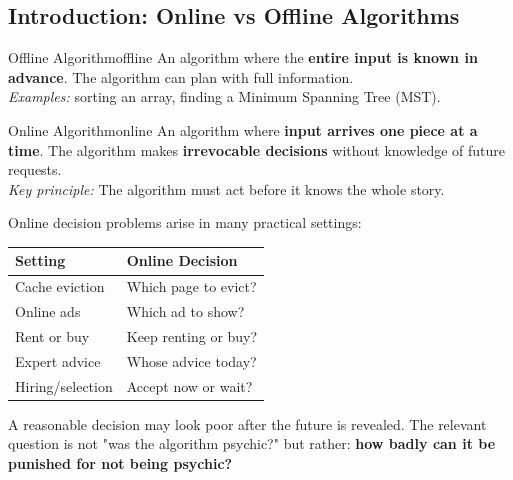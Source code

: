 %                         

\subsection{Introduction: Online vs Offline Algorithms}

\begin{definition}{Offline Algorithm}{offline}
An algorithm where the \textbf{entire input is known in advance}. The algorithm can plan with full information.\\[0.3em]
\textit{Examples:} sorting an array, finding a Minimum Spanning Tree (MST).
\end{definition}

\begin{definition}{Online Algorithm}{online}
An algorithm where \textbf{input arrives one piece at a time}. The algorithm makes \textbf{irrevocable decisions} without knowledge of future requests.\\[0.3em]
\textit{Key principle:} The algorithm must act before it knows the whole story.
\end{definition}

Online decision problems arise in many practical settings:

\begin{center}
\begin{tabular}{ll}
\toprule
\textbf{Setting} & \textbf{Online Decision} \\
\midrule
Cache eviction    & Which page to evict? \\
Online ads        & Which ad to show? \\
Rent or buy       & Keep renting or buy? \\
Expert advice     & Whose advice today? \\
Hiring/selection  & Accept now or wait? \\
\bottomrule
\end{tabular}
\end{center}

A reasonable decision may look poor after the future is revealed. The relevant question is not "was the algorithm psychic?" but rather: \textbf{how badly can it be punished for not being psychic?}

